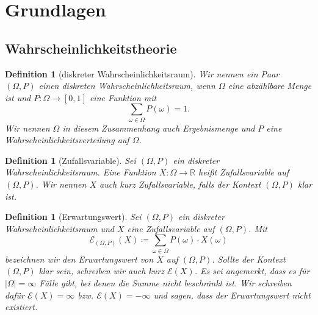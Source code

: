 \documentclass[a4paper]{article}
\newtheorem{definition}[satz]{Definition} %
\theoremstyle{nonumberplain}
\begin{document}
	\section{Grundlagen}
	
	\subsection{Wahrscheinlichkeitstheorie}
	
	\newcommand{\probspace}{diskreter Wahr\-schein\-lich\-keits\-raum}
	\newcommand{\probspacen}{diskreten Wahr\-schein\-lich\-keits\-raum}
	\newcommand{\probspaceexraw}{(\Omega, P)}
	\newcommand{\probspaceex}{$(\Omega, P)$}
	\begin{definition}[\probspace{}] \label{def-probspace}
		\hspace{-0.5em} Wir nennen ein Paar \probspaceex{} einen \probspacen{}, wenn $\Omega$ eine abzählbare Menge ist und $P : \Omega \to [0,1] $ eine Funktion mit
		\begin{equation}
		\sum_{\omega \in \Omega} P(\omega) = 1 \text{.}
		\end{equation} Wir nennen $\Omega$ in diesem Zusammenhang auch Ergebnismenge und $P$ eine Wahr\-schein\-lich\-keitsverteilung auf $\Omega$.
	\end{definition}
	\newcommand{\rvar}{Zufallsvariable}
	\begin{definition}[\rvar{}] \label{def-rvar}
		Sei \probspaceex{} ein \probspace{}. Eine Funktion $X : \Omega \to \mathbb{R}$ heißt \rvar{} auf \probspaceex{}. Wir nennen $X$ auch kurz \rvar{}, falls der Kontext \probspaceex{} klar ist.
	\end{definition}
	\newcommand{\expect}{Erwartungswert}
	\newcommand{\mexp}{\mathcal{E}}
	\begin{definition}[\expect{}] \label{def-expect}
		\hspace{1ex} Sei \probspaceex{} ein \probspace{} und $X$ eine \rvar{} auf \probspaceex{}. Mit
		\begin{equation}
		\mathcal{E}_{\probspaceexraw{}}(X) \coloneqq \sum_{\omega \in \Omega}{P(\omega) \cdot X(\omega)}
		\end{equation}
		bezeichnen wir den \expect{} von $X$ auf \probspaceex{}. Sollte der Kontext \probspaceex{} klar sein, schreiben wir auch kurz $\mathcal{E}(X)$. Es sei angemerkt, dass es für $|\Omega|=\infty$ Fälle gibt, bei denen die Summe nicht beschränkt ist. Wir schreiben dafür $\mathcal{E}(X) = \infty$ bzw. $\mathcal{E}(X) = -\infty$ und sagen, dass der Erwartungswert nicht existiert.
	\end{definition}
\end{document}
